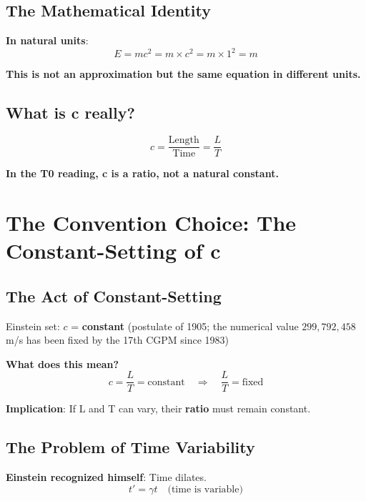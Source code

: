 	\subsection{The Mathematical Identity}
	
	\textbf{In natural units}:
	\begin{equation}
		E = mc^2 = m \times c^2 = m \times 1^2 = m
	\end{equation}
	
	\textbf{This is not an approximation but the same equation in different units.}
	
	\subsection{What is c really?}
	
	\begin{equation}
		c = \frac{\text{Length}}{\text{Time}} = \frac{L}{T}
	\end{equation}
	
	\textbf{In the T0 reading, c is a ratio, not a natural constant.}
	
	\section{The Convention Choice: The Constant-Setting of c}
	
	\subsection{The Act of Constant-Setting}
	
	Einstein set: $c$ = \textbf{constant} (postulate of 1905; the numerical value $299,792,458$ m/s has been fixed by the 17th CGPM since 1983)
	
	\textbf{What does this mean?}
	\begin{equation}
		c = \frac{L}{T} = \text{constant} \quad \Rightarrow \quad \frac{L}{T} = \text{fixed}
	\end{equation}
	
	\textbf{Implication}: If L and T can vary, their \textbf{ratio} must remain constant.
	
	\subsection{The Problem of Time Variability}
	
	\textbf{Einstein recognized himself}: Time dilates.
	\begin{equation}
		t' = \gamma t \quad \text{(time is variable)}
	\end{equation}
	
